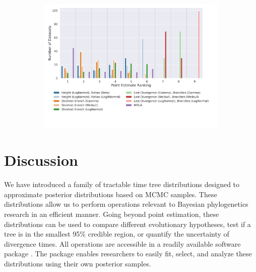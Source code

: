 \documentclass[10pt,letterpaper]{article}
\begin{document}
\begin{figure}
	\begin{subfigure}[b]{0.4\textwidth}
		\centering
		\includegraphics[width=\textwidth]{figures/yule-400-ccd1-point-estimates-ranking.png}
	\end{subfigure}
	
	\label{fig:accuracy-point-estimators-ranking}
\end{figure}

\section*{Discussion}

We have introduced a family of tractable time tree distributions designed to approximate posterior distributions based on MCMC samples. These distributions allow us to perform operations relevant to Bayesian phylogenetics research in an efficient manner. Going beyond point estimation, these distributions can be used to compare different evolutionary hypotheses, test if a tree is in the smallest 95\% credible region, or quantify the uncertainty of divergence times. All operations are accessible in a readily available software package \cite{juliapackage}. The package enables researchers to easily fit, select, and analyze these distributions using their own posterior samples.
\end{document}
